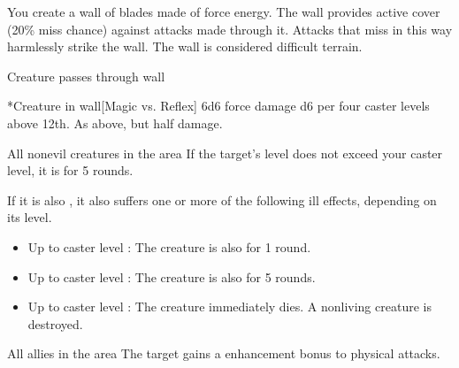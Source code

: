 \spellrng{\rngmed}
\spelldur{\durshort \dismissable}
\spellline
\spelleffect You create a wall of blades made of force energy. The wall provides active cover (20\% miss chance) against attacks made through it. Attacks that miss in this way harmlessly strike the wall. The wall is considered difficult terrain.
\begin{spelltrigger}{Creature passes through wall}
    \begin{spelltargets}*{Creature in wall}[Magic vs. Reflex]
        \spellsuccess 6d6 force damage \add d6 per four caster levels above 12th.
        \spellfailure As above, but half damage.
    \end{spelltargets}
\end{spelltrigger}

\begin{spelltargets}{All nonevil creatures in the area}
    \spelleffect If the target's level does not exceed your caster level, it is \sickened for 5 rounds.

    If it is also \bloodied, it also suffers one or more of the following ill effects, depending on its level.
    \begin{itemize}
        \item Up to caster level : The creature is also \nauseated for 1 round.
        \item Up to caster level : The creature is also \paralyzed for 5 rounds.
        \item Up to caster level : The creature immediately dies. A nonliving creature is destroyed.
    \end{itemize}
\end{spelltargets}

\begin{spelltargets}{All allies in the area}
    \spelleffect The target gains a  enhancement bonus to physical attacks. \spellbonusscalingdescription
\end{spelltargets}

